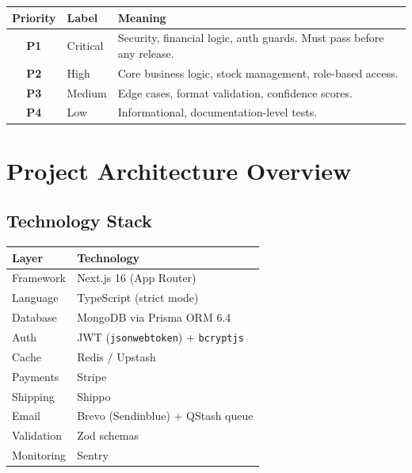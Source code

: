 \documentclass[12pt,a4paper]{report}
\newcommand{\pone}{\textbf{\color{p1red}P1}}
\newcommand{\ptwo}{\textbf{\color{p2orange}P2}}
\newcommand{\pthree}{\textbf{\color{p3blue}P3}}
\newcommand{\pfour}{\textbf{\color{p4green}P4}}
\begin{document}
\begin{center}
\begin{tabular}{clp{9cm}}
  \toprule
  \textbf{Priority} & \textbf{Label} & \textbf{Meaning} \\
  \midrule
  \pone & Critical & Security, financial logic, auth guards. Must pass before any release. \\
  \ptwo & High     & Core business logic, stock management, role-based access. \\
  \pthree & Medium & Edge cases, format validation, confidence scores. \\
  \pfour & Low     & Informational, documentation-level tests. \\
  \bottomrule
\end{tabular}
\end{center}


\chapter{Project Architecture Overview}

\section{Technology Stack}

\begin{center}
\begin{tabularx}{\textwidth}{lX}
  \toprule
  \textbf{Layer} & \textbf{Technology} \\
  \midrule
  Framework    & Next.js 16 (App Router) \\
  Language     & TypeScript (strict mode) \\
  Database     & MongoDB via Prisma ORM 6.4 \\
  Auth         & JWT (\texttt{jsonwebtoken}) + \texttt{bcryptjs} \\
  Cache        & Redis / Upstash \\
  Payments     & Stripe \\
  Shipping     & Shippo \\
  Email        & Brevo (Sendinblue) + QStash queue \\
  Validation   & Zod schemas \\
  Monitoring   & Sentry \\
  \bottomrule
\end{tabularx}
\end{center}
\end{document}
